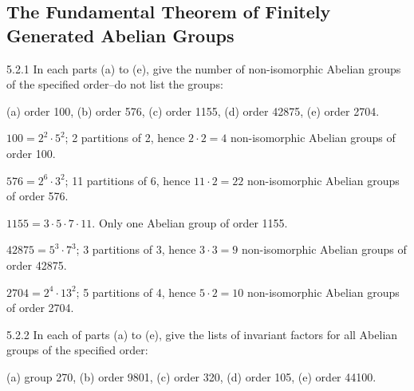 \subsection{The Fundamental Theorem of Finitely Generated Abelian Groups}

\begin{exercise}{5.2.1}
    In each parts (a) to (e), give the number of non-isomorphic Abelian groups of the specified order--do not list the groups:

    \noindent (a) order 100, \quad (b) order 576, \quad (c) order 1155, \quad (d) order 42875, \quad (e) order 2704.
\end{exercise}

\begin{solenum}
    \item $100 = 2^2 \cdot 5^2$; 2 partitions of 2, hence $2 \cdot 2 = 4$ non-isomorphic Abelian groups of order 100.
    \item $576 = 2^6 \cdot 3^2$; 11 partitions of 6, hence $11 \cdot 2 = 22$ non-isomorphic Abelian groups of order 576.
    \item $1155 = 3 \cdot 5 \cdot 7 \cdot 11$.
	Only one Abelian group of order 1155.
    \item $42875 = 5^3 \cdot 7^3$; 3 partitions of 3, hence $3 \cdot 3 = 9$ non-isomorphic Abelian groups of order 42875.
    \item $2704 = 2^4 \cdot 13^2$; 5 partitions of 4, hence $5 \cdot 2 = 10$ non-isomorphic Abelian groups of order 2704.
\end{solenum}

\begin{exercise}{5.2.2}
    In each of parts (a) to (e), give the lists of invariant factors for all Abelian groups of the specified order:

    \noindent (a) group 270, \quad (b) order 9801, \quad (c) order 320, \quad (d) order 105, \quad (e) order 44100.
\end{exercise}

